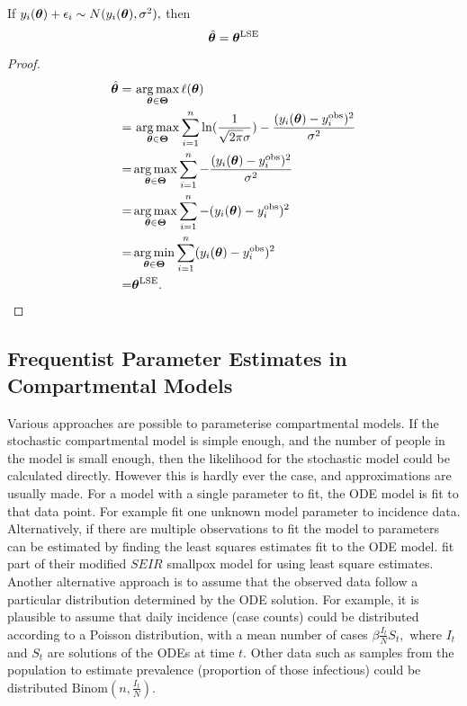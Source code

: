 \begin{theorem}
    If $y_i(\bm{\theta}) + \epsilon_i \sim N(y_i(\bm{\theta}), \sigma^2),$ then
    $$
        \hat{\bm{\theta}} = \bm{\theta}^{\mathrm{LSE}}
    $$
\end{theorem}

\begin{proof}
    \begin{align*}
        \hat{\bm{\theta}}
        = & \, \operatorname*{arg\,max}_{\bm{\theta}\in\mathbf{\Theta}}\ell(\bm{\theta}) \\
        = & \, \operatorname*{arg\,max}_{\bm{\theta}\in\mathbf{\Theta}}
        \sum_{i = 1}^n
        \ln(\frac{1}{\sqrt{2\pi}\sigma})
        -\frac{(y_i(\bm{\theta})- y_i^{\mathrm{obs}})^2}{\sigma^2}            \\
        = & \operatorname*{arg\,max}_{\bm{\theta}\in\mathbf{\Theta}} \sum_{i = 1}^n
        - \frac{(y_i(\bm{\theta})- y_i^{\mathrm{obs}})^2 }{\sigma^2}          \\
        = & \operatorname*{arg\,max}_{\bm{\theta}\in\mathbf{\Theta}} \sum_{i = 1}^n
        - (y_i(\bm{\theta})- y_i^{\mathrm{obs}})^2                            \\
        = & \operatorname*{arg\,min}_{\bm{\theta}\in\mathbf{\Theta}} \sum_{i = 1}^n
        (y_i(\bm{\theta})- y_i^{\mathrm{obs}})^2                              \\
        = & \bm{\theta}^{\mathrm{LSE}}.
    \end{align*}
\end{proof}

\subsection*{Frequentist Parameter Estimates in Compartmental Models}

Various approaches are possible to parameterise compartmental models.
If the stochastic compartmental model is simple enough, and the number of
people in the model is small enough, then the likelihood
for the stochastic model could be calculated directly. However this is hardly
ever the case, and approximations are usually made.
For a model with a single parameter to fit, the ODE model is
fit to that data point. For example \cite{champagne_using_2022} fit one
unknown model parameter to incidence data.
Alternatively, if there are multiple observations to fit the model to
parameters can be estimated by finding the least squares estimates fit to
the ODE model.
\cite{gani_transmission_2001} fit part of their modified $SEIR$ smallpox model
for using least square estimates.
Another alternative approach
is to assume that the observed data follow a particular distribution
determined by the ODE solution. For example, it is plausible to assume that
daily incidence (case counts) could be distributed according to a Poisson
distribution, with a mean number of cases $\beta \frac{I_t}{N}S_t,$ where $I_t$
and $S_t$ are solutions of the ODEs at time $t$.
Other data such as samples from the population to estimate
prevalence (proportion of those infectious) could be
distributed $\mathrm{Binom}(n, \frac{I_t}{N}).$

